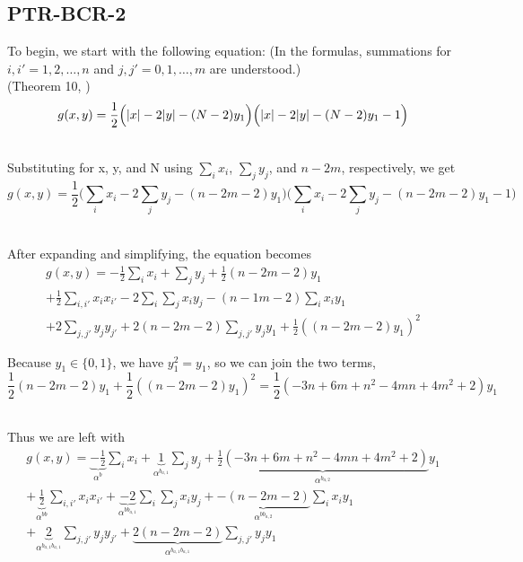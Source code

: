 \documentclass[english,notitlepage,longbibliography,showpacs,preprintnumbers,amsmath,amssymb,aps,prx,nofootinbib,12pt,superscriptaddress]{revtex4-1}
\begin{document}
\subsection{PTR-BCR-2}

To begin, we start with the following equation: (In the formulas, summations for $i,i' = 1,2,\dots,n$ and $j,j' = 0,1,\dots,m$ are understood.)\\
(Theorem 10, \cite{Boros2018boundsPaper})
\begin{equation}
  g(x,y) = \frac{1}{2}\Big(\abs{x} - 2\abs{y} - (N - 2)y_1\Big)\Big(\abs{x} - 2\abs{y} - (N - 2)y_1 - 1\Big)
\end{equation}

\noindent \\Substituting for x, y, and N using $\sum_i x_i$, $\sum_j y_j$, and $n - 2m$, respectively, we get
\begin{equation}
  g(x,y) = \frac{1}{2}\Big(\sum_i x_i - 2\sum_j y_j - (n - 2m - 2)y_1\Big)\Big(\sum_i x_i - 2\sum_j y_j - (n - 2m - 2)y_1 - 1\Big)
\end{equation}

\noindent \\After expanding and simplifying, the equation becomes
\begin{equation}
\begin{split}
  \left.
  g(x,y)
  \right.
  = -\frac{1}{2}\sum_i x_i + \sum_j y_j + \frac{1}{2}(n-2m-2)y_1\\
  + \frac{1}{2}\sum_{i,i'}x_i x_{i'} -2\sum_i \sum_j x_i y_j -(n-1m-2)\sum_i x_i y_{1}\\
  + 2\sum_{j,j'} y_j y_{j'} + 2(n-2m-2)\sum_{j,j'} y_j y_{1} + \frac{1}{2}((n-2m-2)y_1)^2
\end{split}
\end{equation}

\noindent Because $y_{1}\in\{0,1\}$, we have $y_{1}^2=y_{1}$, so we can join the two terms,
\begin{equation}
  \frac{1}{2}(n-2m-2)y_1 + \frac{1}{2}((n-2m-2)y_1)^2 = \frac{1}{2}(-3n + 6m + n^2 - 4mn + 4m^2 + 2)y_1
\end{equation}

\noindent \\Thus we are left with
\begin{equation}
\begin{split}
  \left.
  g(x,y)
  \right.
  = \underbrace{-\frac{1}{2}}_{\alpha^b}\sum_i x_i
  + \underbrace{1}_{\alpha^{b_{a,1}}}\sum_j y_j
  + \underbrace{\frac{1}{2}(-3n + 6m + n^2 - 4mn + 4m^2 + 2)}_{\alpha^{b_{a,2}}}y_1\\
  + \underbrace{\frac{1}{2}}_{\alpha^{bb}}\sum_{i,i'}x_i x_{i'}
  + \underbrace{-2}_{\alpha^{bb_{a,1}}}\sum_i \sum_j x_i y_j
  + \underbrace{-(n-2m-2)}_{\alpha^{bb_{a,2}}}\sum_i x_i y_{1}\\
  + \underbrace{2}_{\alpha^{b_{a,1}b_{a,1}}}\sum_{j,j'} y_j y_{j'}
  + \underbrace{2(n-2m-2)}_{\alpha^{b_{a,1}b_{a,1}}}\sum_{j,j'} y_j y_{1}
\end{split}
\end{equation}
\end{document}
